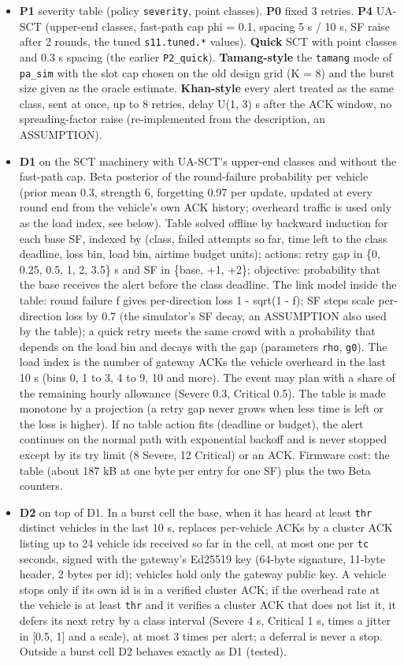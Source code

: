 \begin{itemize}
\item \textbf{P1} severity table (policy \texttt{severity}, point classes). \textbf{P0} fixed 3 retries. \textbf{P4} UA-SCT (upper-end classes, fast-path cap phi = 0.1, spacing 5 s / 10 s, SF raise after 2 rounds, the tuned \texttt{s11.tuned.*} values). \textbf{Quick} SCT with point classes and 0.3 s spacing (the earlier \texttt{P2\_quick}). \textbf{Tamang-style} the \texttt{tamang} mode of \texttt{pa\_sim} with the slot cap chosen on the old design grid (K = 8) and the burst size given as the oracle estimate. \textbf{Khan-style} every alert treated as the same class, sent at once, up to 8 retries, delay U(1, 3) s after the ACK window, no spreading-factor raise (re-implemented from the description, an ASSUMPTION).
\item \textbf{D1} on the SCT machinery with UA-SCT's upper-end classes and without the fast-path cap. Beta posterior of the round-failure probability per vehicle (prior mean 0.3, strength 6, forgetting 0.97 per update, updated at every round end from the vehicle's own ACK history; overheard traffic is used only as the load index, see below). Table solved offline by backward induction for each base SF, indexed by (class, failed attempts so far, time left to the class deadline, loss bin, load bin, airtime budget units); actions: retry gap in \{0, 0.25, 0.5, 1, 2, 3.5\} s and SF in \{base, +1, +2\}; objective: probability that the base receives the alert before the class deadline. The link model inside the table: round failure f gives per-direction loss 1 - sqrt(1 - f); SF steps scale per-direction loss by 0.7 (the simulator's SF decay, an ASSUMPTION also used by the table); a quick retry meets the same crowd with a probability that depends on the load bin and decays with the gap (parameters \texttt{rho}, \texttt{g0}). The load index is the number of gateway ACKs the vehicle overheard in the last 10 s (bins 0, 1 to 3, 4 to 9, 10 and more). The event may plan with a share of the remaining hourly allowance (Severe 0.3, Critical 0.5). The table is made monotone by a projection (a retry gap never grows when less time is left or the loss is higher). If no table action fits (deadline or budget), the alert continues on the normal path with exponential backoff and is never stopped except by its try limit (8 Severe, 12 Critical) or an ACK. Firmware cost: the table (about 187 kB at one byte per entry for one SF) plus the two Beta counters.
\item \textbf{D2} on top of D1. In a burst cell the base, when it has heard at least \texttt{thr} distinct vehicles in the last 10 s, replaces per-vehicle ACKs by a cluster ACK listing up to 24 vehicle ids received so far in the cell, at most one per \texttt{tc} seconds, signed with the gateway's Ed25519 key (64-byte signature, 11-byte header, 2 bytes per id); vehicles hold only the gateway public key. A vehicle stops only if its own id is in a verified cluster ACK; if the overhead rate at the vehicle is at least \texttt{thr} and it verifies a cluster ACK that does not list it, it defers its next retry by a class interval (Severe 4 s, Critical 1 s, times a jitter in [0.5, 1] and a scale), at most 3 times per alert; a deferral is never a stop. Outside a burst cell D2 behaves exactly as D1 (tested).

\end{itemize}
